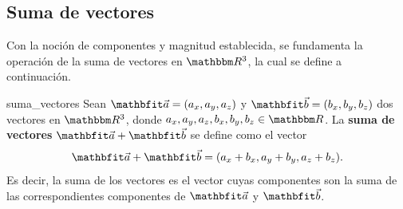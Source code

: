 \subsection{Suma de vectores}

Con la noción de componentes y magnitud establecida, se fundamenta la operación de la suma de vectores en $\RR[3]$, la cual se define a continuación.

\begin{definition}{}{suma_vectores}
    Sean $\veca = (a_x, a_y, a_z)$ y $\vecb = (b_x, b_y, b_z)$ dos vectores en $\RR[3]$, donde $a_x, a_y, a_z, b_x, b_y, b_z \in \RR$. La \textbf{suma de vectores} $\veca + \vecb$ se define como el vector
    $$\veca + \vecb = (a_x + b_x, a_y + b_y, a_z + b_z).$$
    Es decir, la suma de los vectores es el vector cuyas componentes son la suma de las correspondientes componentes de $\veca$ y $\vecb$.
\end{definition}

